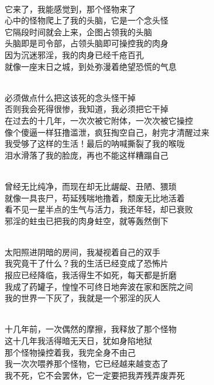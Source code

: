 \begin{poem}[恶念附体]
    \begin{multicols}{2}
        \begin{center}~\\
            它来了，我能感觉到，那个怪物来了 \\ 心中的怪物爬上了我的头脑，它是一个念头怪 \\ 它隔段时间就会上来，企图占领我的头脑 \\ 头脑即是司令部，占领头脑即可操控我的肉身 \\ 因为沉迷邪淫，我的肉身已经千疮百孔 \\ 就像一座末日之城，到处弥漫着绝望恐慌的气息

            ~\\

            必须做点什么把这该死的念头怪干掉 \\ 否则我会死得很惨，我知道，我必须把它干掉 \\ 在过去的十几年，一次次被它附体，一次次被它操控 \\ 像个傻逼一样狂撸滥泄，疯狂掏空自己，射完才清醒过来 \\ 我受够了这样的生活！最后的呐喊撕裂了我的喉咙 \\ 泪水滑落了我的脸庞，再也不能这样糟蹋自己

            ~\\

            曾经无比纯净，而现在却无比龌龊、丑陋、猥琐 \\ 就像一具丧尸，苟延残喘地撸着，颓废无比地活着 \\ 看不见一星半点的生气与活力，我还年轻，却已衰败 \\ 邪淫的蛀虫已把我的肉身蛀空，就等轰然倒下

            ~\\

            太阳照进阴暗的房间，我凝视着自己的双手 \\ 我究竟干了什么？我的生活已经变成了恐怖片 \\ 报应已经降临，我活得生不如死，每天都是折磨 \\ 我成了药罐子，惶惶不可终日地奔波在家和医院之间 \\ 我的世界一下灰了，我就是一个邪淫的灰人

            ~\\

            十几年前，一次偶然的摩擦，我释放了那个怪物 \\ 这十几年我活得暗无天日，犹如身陷地狱 \\ 那个怪物操控着我，我完全身不由己 \\ 我一次次喂养那个怪物，它已经越来越变态了 \\ 我不死，它不会罢休，它一定要把我弄残弄废弄死


\end{center}
\end{multicols}
\end{poem}
